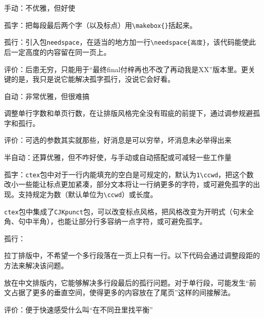 \documentclass[10pt,openany]{book}
\begin{document}
\begin{tightitem}
    \item   手动：不优雅，但好使
\end{tightitem}

孤字：把每段最后两个字（以及标点）用\texttt{\textbackslash{}makebox\{\}}括起来。

孤行：引入包\texttt{needspace}，在适当的地方加一行\texttt{\textbackslash{}needspace\{高度\}}，该代码能使此后一定高度的内容留在同一页上。

评价：后患无穷，只能用于“最终final付梓再也不改了再动我是XX”版本里。更关键的是，我只是说它能解决孤字孤行，没说它会好看。

\begin{tightitem}
    \item   自动：非常优雅，但很难搞
\end{tightitem}

调整单行字数和单页行数，在让排版风格完全没有瑕疵的前提下，通过调参规避孤字和孤行。

评价：可选的参数其实就那些，好消息是可以穷举，坏消息未必举得出来

\begin{tightitem}
    \item   半自动：还算优雅，但不咋好使，与手动或自动搭配或可减轻一些工作量
\end{tightitem}

孤字：\texttt{ctex}包中对于一行内能填充的空白是可规定的，默认为\texttt{1\textbackslash{}ccwd}，把这个数改小一些能让标点更加紧凑，部分文本将让一行纳更多的字符，或可避免孤字的出现。支持规定为数（默认单位为\texttt{\textbackslash{}ccwd}）或长度。



\texttt{ctex}包中集成了\texttt{CJKpunct}包，可以改变标点风格，把风格改变为开明式（句末全角、句中半角），也能让部分行多容纳一点字符，或可避免孤字。



孤行：

拉丁排版中，不希望一个多行段落在一页上只有一行。以下代码会通过调整段距的方法来解决该问题。



放在中文排版内，它能够解决多行段最后的孤行问题。对于单行段，可能发生“前文占据了更多的垂直空间，使得更多的内容放在了尾页”这样的间接解法。

评价：便于快速感受什么叫“在不同丑里找平衡”
\end{document}
